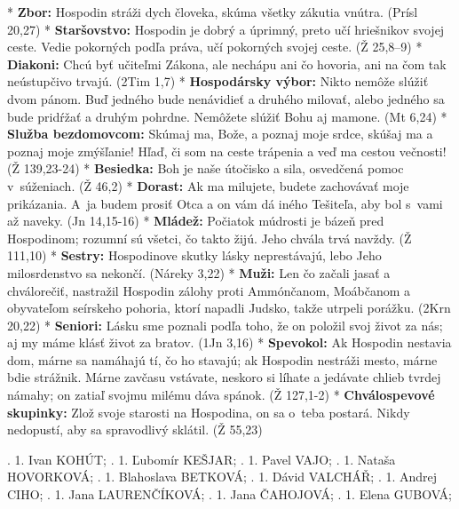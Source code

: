 \begitems
* {\bf Zbor:} Hospodin stráži dych človeka, skúma všetky zákutia vnútra. (Prísl 20,27)
* {\bf Staršovstvo:} Hospodin je dobrý a úprimný, preto učí hriešnikov svojej ceste. Vedie pokorných podľa práva, učí pokorných svojej ceste. (Ž 25,8--9)
* {\bf Diakoni:} Chcú byť učiteľmi Zákona, ale nechápu ani čo hovoria, ani na čom tak neústupčivo trvajú. (2Tim 1,7)
* {\bf Hospodársky výbor:} Nikto nemôže slúžiť dvom pánom. Buď jedného bude nenávidieť a druhého milovať, alebo jedného sa bude pridŕžať a druhým pohrdne. Nemôžete slúžiť Bohu aj mamone. (Mt 6,24)
* {\bf Služba bezdomovcom:} Skúmaj ma, Bože, a poznaj moje srdce, skúšaj ma a poznaj moje zmýšľanie! Hľaď, či som na ceste trápenia a veď ma cestou večnosti! (Ž 139,23-24)
* {\bf Besiedka:} Boh je naše útočisko a sila, osvedčená pomoc v~súženiach. (Ž 46,2)
* {\bf Dorast:} Ak ma milujete, budete zachovávať moje prikázania. A~ja budem prosiť Otca a on vám dá iného Tešiteľa, aby bol s~vami až naveky. (Jn 14,15-16)
* {\bf Mládež:} Počiatok múdrosti je bázeň pred Hospodinom; rozumní sú všetci, čo takto žijú. Jeho chvála trvá navždy. (Ž 111,10)
* {\bf Sestry:} Hospodinove skutky lásky neprestávajú, lebo Jeho milosrdenstvo sa nekončí. (Náreky 3,22)
* {\bf Muži:} Len čo začali jasať a chválorečiť, nastražil Hospodin zálohy proti Ammónčanom, Moábčanom a obyvateľom seírskeho pohoria, ktorí napadli Judsko, takže utrpeli porážku. (2Krn 20,22)
* {\bf Seniori:} Lásku sme poznali podľa toho, že on položil svoj život za nás; aj my máme klásť život za bratov. (1Jn 3,16)
* {\bf Spevokol:} Ak Hospodin nestavia dom, márne sa namáhajú tí, čo ho stavajú; ak Hospodin nestráži mesto, márne bdie strážnik. Márne zavčasu vstávate, neskoro si líhate a jedávate chlieb tvrdej námahy; on zatiaľ svojmu milému dáva spánok. (Ž 127,1-2)
* {\bf Chválospevové skupinky:} Zlož svoje starosti na Hospodina, on sa o~teba postará. Nikdy nedopustí, aby sa spravodlivý sklátil. (Ž 55,23)
\enditems


.	1.	Ivan	KOHÚT;
.	1.	Ľubomír	KEŠJAR;
.	1.	Pavel	VAJO;
.	1.	Nataša	HOVORKOVÁ;
.	1.	Blahoslava	BETKOVÁ;
.	1.	Dávid	VALCHÁŘ;
.	1.	Andrej	CIHO;
.	1.	Jana	LAURENČÍKOVÁ;
.	1.	Jana	ČAHOJOVÁ;
.	1.	Elena	GUBOVÁ;
\narodeniny


